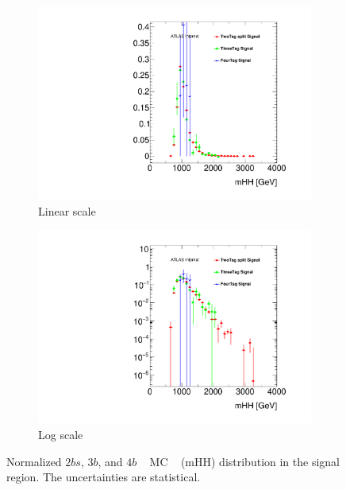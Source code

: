 \begin{figure}[htb!]
  \centering
  \captionsetup{justification=centering}
  \hspace{-0.5cm}
    \begin{subfigure}[b]{0.45\textwidth}
        \includegraphics[width=\textwidth,angle=-90]{figures/boosted/Other/ttbar_compare_mHH_l.pdf}
        \caption{Linear scale}
        \label{fig:ttshapeComp_lin}
    \end{subfigure}
    \quad
    \begin{subfigure}[b]{0.45\textwidth}
        \includegraphics[width=\textwidth,angle=-90]{figures/boosted/Other/ttbar_compare_mHH_l_1.pdf}
        \caption{Log scale}
        \label{fig:ttshapeComp_log}
    \end{subfigure}
   \caption{Normalized $2bs$, $3b$, and $4b$ \ttbar~ MC \mtwoJ~ (mHH) distribution in the signal region. The uncertainties are statistical.}
  \label{fig:ttshapeComp}
\end{figure}


